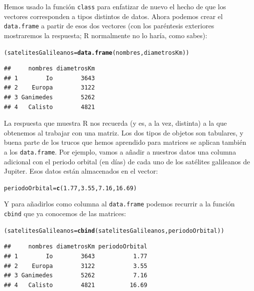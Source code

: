 \documentclass[10pt,a4paper]{article}\usepackage[]{graphicx}\usepackage[]{color}
\makeatletter
\newcommand{\hlnum}[1]{\textcolor[rgb]{0.686,0.059,0.569}{#1}}%
\newcommand{\hlstd}[1]{\textcolor[rgb]{0.345,0.345,0.345}{#1}}%
\newcommand{\hlkwb}[1]{\textcolor[rgb]{0.69,0.353,0.396}{#1}}%
\newcommand{\hlkwd}[1]{\textcolor[rgb]{0.737,0.353,0.396}{\textbf{#1}}}%
\newenvironment{kframe}{%
 \def\at@end@of@kframe{}%
 \ifinner\ifhmode%
  \def\at@end@of@kframe{\end{minipage}}%
  \begin{minipage}{\columnwidth}%
 \fi\fi%
 \def\FrameCommand##1{\hskip\@totalleftmargin \hskip-\fboxsep
 \colorbox{shadecolor}{##1}\hskip-\fboxsep
     \hskip-\linewidth \hskip-\@totalleftmargin \hskip\columnwidth}%
 \MakeFramed {\advance\hsize-\width
   \@totalleftmargin\z@ \linewidth\hsize
   \@setminipage}}%
 {\par\unskip\endMakeFramed%
 \at@end@of@kframe}
\newenvironment{knitrout}{}{} %
\makeatother
\begin{document}
Hemos usado la función {\tt class} para enfatizar de nuevo el hecho de que los vectores corresponden a tipos distintos de datos. Ahora podemos crear el {\tt data.frame} a partir de esos dos vectores (con los paréntesis exteriores mostraremos la respuesta; R normalmente no lo haría, como sabes):
\begin{knitrout}
\color{fgcolor}\begin{kframe}
\begin{alltt}
\hlstd{(satelitesGalileanos} \hlkwb{=} \hlkwd{data.frame}\hlstd{(nombres, diametrosKm) )}
\end{alltt}
\begin{verbatim}
##     nombres diametrosKm
## 1        Io        3643
## 2    Europa        3122
## 3 Ganimedes        5262
## 4   Calisto        4821
\end{verbatim}
\end{kframe}
\end{knitrout}
La respuesta que muestra R nos recuerda (y es, a la vez, distinta) a la que obtenemos al trabajar con una matriz. Los dos tipos de objetos son tabulares, y buena parte de los trucos que hemos aprendido para matrices se aplican también a los {\tt data.frame}. Por ejemplo, vamos a añadir a nuestros datos una columna adicional con el periodo orbital (en días) de cada uno de los satélites galileanos de Jupiter. Esos  datos están almacenados en el vector:
\begin{knitrout}
\color{fgcolor}\begin{kframe}
\begin{alltt}
\hlstd{periodoOrbital} \hlkwb{=} \hlkwd{c}\hlstd{(}\hlnum{1.77}\hlstd{,} \hlnum{3.55}\hlstd{,} \hlnum{7.16}\hlstd{,} \hlnum{16.69}\hlstd{)}
\end{alltt}
\end{kframe}
\end{knitrout}
Y para añadirlos como columna al {\tt data.frame} podemos recurrir a la función {\tt cbind} que ya conocemos de las matrices:
\begin{knitrout}
\color{fgcolor}\begin{kframe}
\begin{alltt}
\hlstd{(satelitesGalileanos} \hlkwb{=} \hlkwd{cbind}\hlstd{(satelitesGalileanos, periodoOrbital) )}
\end{alltt}
\begin{verbatim}
##     nombres diametrosKm periodoOrbital
## 1        Io        3643           1.77
## 2    Europa        3122           3.55
## 3 Ganimedes        5262           7.16
## 4   Calisto        4821          16.69
\end{verbatim}
\end{kframe}
\end{knitrout}
\end{document}
